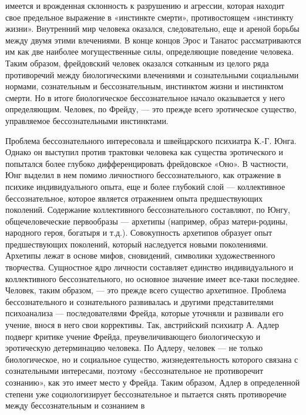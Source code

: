 \documentclass[12pt]{article}
\begin{document}
имеется и врожденная склонность к разрушению и агрессии, которая находит свое предельное выражение в
«инстинкте смерти», противостоящем «инстинкту жизни». Внутренний мир человека оказался, следовательно,
еще и ареной борьбы между двумя этими влечениями. В конце концов Эрос и Танатос рассматриваются им как
две наиболее могущественные силы, определяющие поведение человека.
Таким образом, фрейдовский человек оказался сотканным из целого ряда противоречий между биологическими
влечениями и сознательными социальными нормами, сознательным и бессознательным, инстинктом жизни и
инстинктом смерти. Но в итоге биологическое бессознательное начало оказывается у него определяющим.
Человек, по Фрейду, — это прежде всего эротическое существо, управляемое бессознательными инстинктами.

Проблема бессознательного интересовала и швейцарского психиатра К.-Г. Юнга. Однако он выступил против
трактовки человека как существа эротического и попытался более глубоко дифференцировать фрейдовское
«Оно». В частности, Юнг выделил в нем помимо личностного бессознательного, как отражение в психике
индивидуального  опыта,  еще  и  более  глубокий  слой  —  коллективное  бессознательное,  которое  является 
отражением опыта предшествующих поколений. Содержание коллективного бессознательного составляют, по
Юнгу, общечеловеческие первообразы — архетипы (например, образ матери-родины, народного героя, богатыря
и  т.д.).  Совокупность  архетипов  образует  опыт  предшествующих  поколений,  который  наследуется  новыми
поколениями.  Архетипы  лежат  в  основе  мифов,  сновидений,  символики  художественного  творчества.
Сущностное  ядро  личности  составляет  единство  индивидуального  и  коллективного  бессознательного,  но
основное  значение  имеет  все-таки  последнее.  Человек,  таким  образом,  —  это  прежде  всего  существо
архетипное.
Проблема  бессознательного  и  сознательного  развивалась  и  другими  представителями  психоанализа  —
последователями  Фрейда,  которые  уточняли  и  развивали  его  учение,  внося  в  него  свои  коррективы.  Так,
австрийский  психиатр  А.  Адлер  подверг  критике  учение  Фрейда,  преувеличивающего  биологическую  и
эротическую  детерминацию  человека.  По  Адлеру,  человек  —  не  только  биологическое,  но  и  социальное
существо,  жизнедеятельность  которого  связана  с  сознательными  интересами,  поэтому  «бессознательное  не
противоречит сознанию», как это имеет место у Фрейда. Таким образом, Адлер в определенной степени уже
социологизирует  бессознательное  и  пытается  снять  противоречие  между  бессознательным  и  сознанием  в
\end{document}
